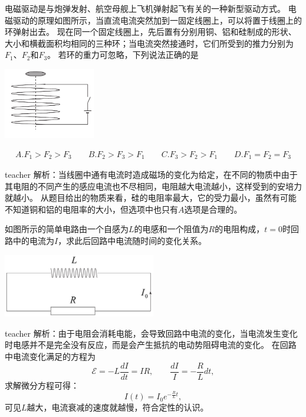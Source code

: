 \begin{example}

电磁驱动是与炮弹发射、航空母舰上飞机弹射起飞有关的一种新型驱动方式。
电磁驱动的原理如图所示，当直流电流突然加到一固定线圈上，可以将置于线圈上的环弹射出去。
现在同一个固定线圈上，先后置有分别用铜、铝和硅制成的形状、大小和横截面积均相同的三种环；当电流突然接通时，它们所受到的推力分别为$F_1$、$F_2$和$F_3$。
若环的重力可忽略，下列说法正确的是
\begin{flushright}
\includegraphics[width = 0.3\textwidth]{images/mag-28.pdf} 
\end{flushright}
\begin{eqnarray*}
 A. F_1>F_2>F_3\qquad  B. F_2>F_3>F_1\qquad C. F_3>F_2>F_1\qquad  D. F_1=F_2=F_3
\end{eqnarray*}
\begin{taggedblock}{teacher}
\noindent
解析：当线圈中通有电流时造成磁场的变化为给定，在不同的物质中由于其电阻的不同产生的感应电流也不尽相同，电阻越大电流越小，这样受到的安培力就越小。
从题目给出的物质来看，硅的电阻率最大，它的受力最小，虽然有可能不知道铜和铝的电阻率的大小，但选项中也只有$A$选项是合理的。

\end{taggedblock}
\end{example}

\begin{example}
如图所示的简单电路由一个自感为$L$的电感和一个阻值为$R$的电阻构成，$t=0$时回路中的电流为$I$，求此后回路中电流随时间的变化关系。
\begin{flushright}
\includegraphics[width = 0.5\textwidth]{images/mag-39.pdf} 
\end{flushright}

\begin{taggedblock}{teacher}
\noindent
解析：由于电阻会消耗电能，会导致回路中电流的变化，当电流发生变化时电感并不是完全没有反应，而是会产生抵抗的电动势阻碍电流的变化。
在回路中电流变化满足的方程为
\[\mathcal{E} = -L \frac{dI}{dt} = IR,\qquad \frac{dI}{I} = - \frac{R}{L}dt,\]
求解微分方程可得：
\[
I(t) = I_0e^{- \frac{R}{L}t},
\]
可见$L$越大，电流衰减的速度就越慢，符合定性的认识。
\end{taggedblock}
\end{example}


